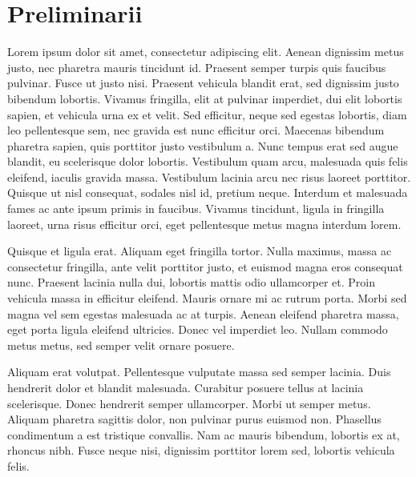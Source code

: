 \chapter{Preliminarii}

Lorem ipsum dolor sit amet, consectetur adipiscing elit. Aenean dignissim metus justo, nec pharetra mauris tincidunt id. Praesent semper turpis quis faucibus pulvinar. Fusce ut justo nisi. Praesent vehicula blandit erat, sed dignissim justo bibendum lobortis. Vivamus fringilla, elit at pulvinar imperdiet, dui elit lobortis sapien, et vehicula urna ex et velit. Sed efficitur, neque sed egestas lobortis, diam leo pellentesque sem, nec gravida est nunc efficitur orci. Maecenas bibendum pharetra sapien, quis porttitor justo vestibulum a. Nunc tempus erat sed augue blandit, eu scelerisque dolor lobortis. Vestibulum quam arcu, malesuada quis felis eleifend, iaculis gravida massa. Vestibulum lacinia arcu nec risus laoreet porttitor. Quisque ut nisl consequat, sodales nisl id, pretium neque. Interdum et malesuada fames ac ante ipsum primis in faucibus. Vivamus tincidunt, ligula in fringilla laoreet, urna risus efficitur orci, eget pellentesque metus magna interdum lorem.

Quisque et ligula erat. Aliquam eget fringilla tortor. Nulla maximus, massa ac consectetur fringilla, ante velit porttitor justo, et euismod magna eros consequat nunc. Praesent lacinia nulla dui, lobortis mattis odio ullamcorper et. Proin vehicula massa in efficitur eleifend. Mauris ornare mi ac rutrum porta. Morbi sed magna vel sem egestas malesuada ac at turpis. Aenean eleifend pharetra massa, eget porta ligula eleifend ultricies. Donec vel imperdiet leo. Nullam commodo metus metus, sed semper velit ornare posuere.

Aliquam erat volutpat. Pellentesque vulputate massa sed semper lacinia. Duis hendrerit dolor et blandit malesuada. Curabitur posuere tellus at lacinia scelerisque. Donec hendrerit semper ullamcorper. Morbi ut semper metus. Aliquam pharetra sagittis dolor, non pulvinar purus euismod non. Phasellus condimentum a est tristique convallis. Nam ac mauris bibendum, lobortis ex at, rhoncus nibh. Fusce neque nisi, dignissim porttitor lorem sed, lobortis vehicula felis.